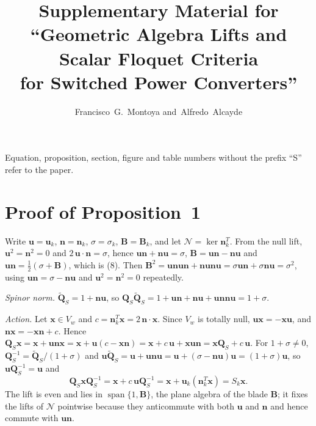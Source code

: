 \documentclass[journal]{IEEEtran}
\newcommand{\rev}[1]{\widetilde{#1}}
\begin{document}
\title{Supplementary Material for\\ ``Geometric Algebra Lifts and Scalar Floquet Criteria\\ for Switched Power Converters''}
\author{Francisco~G.~Montoya and~Alfredo~Alcayde}
\maketitle

Equation, proposition, section, figure and table numbers without the prefix
``S'' refer to the paper.

\section{Proof of Proposition~1}
Write $\bm{u}=\bm{u}_k$, $\bm{n}=\bm{n}_k$, $\sigma=\sigma_k$, $\bm{B}=\bm{B}_k$,
and let $\mathcal{N}=\ker\bm{n}_k^{T}$. From the null lift, $\bm{u}^2=\bm{n}^2=0$
and $2\,\bm{u}\!\cdot\!\bm{n}=\sigma$, hence $\bm{u}\bm{n}+\bm{n}\bm{u}=\sigma$,
$\bm{B}=\bm{u}\bm{n}-\bm{n}\bm{u}$ and $\bm{u}\bm{n}=\tfrac12(\sigma+\bm{B})$,
which is (8). Then
$\bm{B}^2=\bm{u}\bm{n}\bm{u}\bm{n}+\bm{n}\bm{u}\bm{n}\bm{u}
=\sigma\bm{u}\bm{n}+\sigma\bm{n}\bm{u}=\sigma^2$, using
$\bm{u}\bm{n}=\sigma-\bm{n}\bm{u}$ and $\bm{u}^2=\bm{n}^2=0$ repeatedly.

\emph{Spinor norm.} $\rev{\bm{Q}}_S=1+\bm{n}\bm{u}$, so
$\bm{Q}_S\rev{\bm{Q}}_S=1+\bm{u}\bm{n}+\bm{n}\bm{u}+\bm{u}\bm{n}\bm{n}\bm{u}
=1+\sigma$.

\emph{Action.} Let $\bm{x}\in V_w$ and $c=\bm{n}_k^{T}\bm{x}=2\,\bm{n}\!\cdot\!\bm{x}$.
Since $V_w$ is totally null, $\bm{u}\bm{x}=-\bm{x}\bm{u}$, and
$\bm{n}\bm{x}=-\bm{x}\bm{n}+c$. Hence
$\bm{Q}_S\bm{x}=\bm{x}+\bm{u}\bm{n}\bm{x}=\bm{x}+\bm{u}(c-\bm{x}\bm{n})
=\bm{x}+c\,\bm{u}+\bm{x}\bm{u}\bm{n}=\bm{x}\bm{Q}_S+c\,\bm{u}$. For
$1+\sigma\neq0$, $\bm{Q}_S^{-1}=\rev{\bm{Q}}_S/(1+\sigma)$ and
$\bm{u}\rev{\bm{Q}}_S=\bm{u}+\bm{u}\bm{n}\bm{u}=\bm{u}+(\sigma-\bm{n}\bm{u})\bm{u}
=(1+\sigma)\bm{u}$, so $\bm{u}\bm{Q}_S^{-1}=\bm{u}$ and
\begin{equation*}
\bm{Q}_S\bm{x}\bm{Q}_S^{-1}=\bm{x}+c\,\bm{u}\bm{Q}_S^{-1}
=\bm{x}+\bm{u}_k(\bm{n}_k^{T}\bm{x})=S_k\bm{x}.
\end{equation*}
The lift is even and lies in $\operatorname{span}\{1,\bm{B}\}$, the plane
algebra of the blade $\bm{B}$; it fixes the lifts of $\mathcal{N}$ pointwise
because they anticommute with both $\bm{u}$ and $\bm{n}$ and hence commute
with $\bm{u}\bm{n}$.
\end{document}

